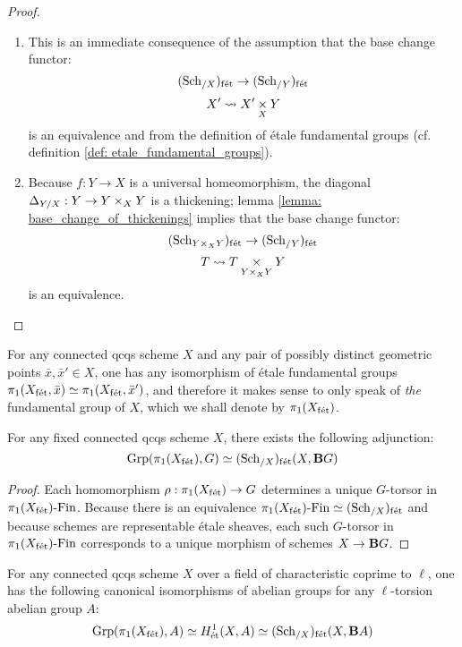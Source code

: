             \begin{proof}
                \noindent
                \begin{enumerate}
                    \item This is an immediate consequence of the assumption that the base change functor:
                        $$(\mathrm{Sch}_{/X})_{\mathrm{f\acute{e}t}} \to (\mathrm{Sch}_{/Y})_{\mathrm{f\acute{e}t}}$$
                        $$X' \mapsto X' \x_X Y$$
                    is an equivalence and from the definition of \'etale fundamental groups (cf. definition \ref{def: etale_fundamental_groups}).
                    \item Because $f: Y \to X$ is a universal homeomorphism, the diagonal $\Delta_{Y/X}: Y \to Y \x_X Y$ is a thickening; lemma \ref{lemma: base_change_of_thickenings} implies that the base change functor:
                        $$(\Sch_{Y \x_X Y})_{\fet} \to (\Sch_{/Y})_{\fet}$$
                        $$T \mapsto T \x_{Y \x_X Y} Y$$
                    is an equivalence. 
                \end{enumerate}
            \end{proof}
        \begin{corollary} \label{coro: etale_fundamental_group_uniqueness}
            For any connected qcqs scheme $X$ and any pair of possibly distinct geometric points $\bar{x}, \bar{x}' \in X$, one has any isomorphism of \'etale fundamental groups $\pi_1(X_{\mathrm{f\acute{e}t}}, \bar{x}) \simeq \pi_1(X_{\mathrm{f\acute{e}t}}, \bar{x}')$, and therefore it makes sense to only speak of \textit{the} fundamental group of $X$, which we shall denote by $\pi_1(X_{\mathrm{f\acute{e}t}})$.
        \end{corollary}
        
        \begin{proposition} \label{prop: etale_fundamental_group_functoriality}
            For any fixed connected qcqs scheme $X$, there exists the following adjunction:
                $$\mathrm{Grp}(\pi_1(X_{\mathrm{f\acute{e}t}}), G) \simeq (\mathrm{Sch}_{/X})_{\mathrm{f\acute{e}t}}(X, \mathbf{B} G)$$
        \end{proposition}
            \begin{proof}
                Each homomorphism $\rho: \pi_1(X_{\mathrm{f\acute{e}t}}) \to G$ determines a unique $G$-torsor in $\pi_1(X_{\mathrm{f\acute{e}t}})\text{-}\mathrm{Fin}$. Because there is an equivalence $\pi_1(X_{\mathrm{f\acute{e}t}})\text{-}\mathrm{Fin} \simeq (\mathrm{Sch}_{/X})_{\mathrm{f\acute{e}t}}$ and because schemes are representable \'etale sheaves, each such $G$-torsor in $\pi_1(X_{\mathrm{f\acute{e}t}})\text{-}\mathrm{Fin}$ corresponds to a unique morphism of schemes $X \to \mathbf{B} G$.
            \end{proof}
        \begin{corollary} \label{coro: etale_eckmann_hilton_duality}
            For any connected qcqs scheme $X$ over a field of characteristic coprime to $\ell$, one has the following canonical isomorphisms of abelian groups for any $\ell$-torsion abelian group $A$:
                $$\mathrm{Grp}(\pi_1(X_{\mathrm{f\acute{e}t}}), A) \simeq H^1_{\mathrm{\acute{e}t}}(X, A) \simeq (\mathrm{Sch}_{/X})_{\mathrm{f\acute{e}t}}(X, \mathbf{B} A)$$
        \end{corollary}
        
